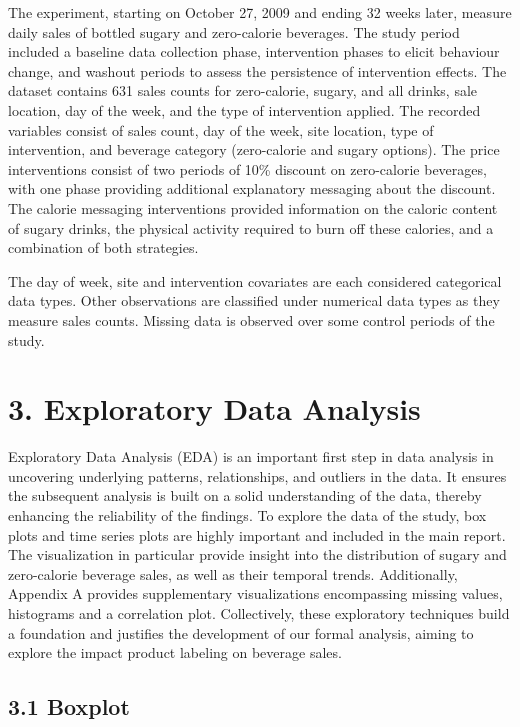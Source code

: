 \documentclass[
]{article}
\begin{document}
The experiment, starting on October 27, 2009 and ending 32 weeks later, measure daily sales of bottled sugary and zero-calorie beverages. The study period included a baseline data collection phase, intervention phases to elicit behaviour change, and washout periods to assess the persistence of intervention effects. The dataset contains 631 sales counts for zero-calorie, sugary, and all drinks, sale location, day of the week, and the type of intervention applied. The recorded variables consist of sales count, day of the week, site location, type of intervention, and beverage category (zero-calorie and sugary options). The price interventions consist of two periods of 10\% discount on zero-calorie beverages, with one phase providing additional explanatory messaging about the discount. The calorie messaging interventions provided information on the caloric content of sugary drinks, the physical activity required to burn off these calories, and a combination of both strategies.

The day of week, site and intervention covariates are each considered categorical data types. Other observations are classified under numerical data types as they measure sales counts. Missing data is observed over some control periods of the study.

\hypertarget{exploratory-data-analysis}{%
\section{3. Exploratory Data Analysis}\label{exploratory-data-analysis}}

Exploratory Data Analysis (EDA) is an important first step in data analysis in uncovering underlying patterns, relationships, and outliers in the data. It ensures the subsequent analysis is built on a solid understanding of the data, thereby enhancing the reliability of the findings. To explore the data of the study, box plots and time series plots are highly important and included in the main report. The visualization in particular provide insight into the distribution of sugary and zero-calorie beverage sales, as well as their temporal trends. Additionally, Appendix A provides supplementary visualizations encompassing missing values, histograms and a correlation plot. Collectively, these exploratory techniques build a foundation and justifies the development of our formal analysis, aiming to explore the impact product labeling on beverage sales.

\hypertarget{boxplot}{%
\subsection{3.1 Boxplot}\label{boxplot}}
\end{document}
